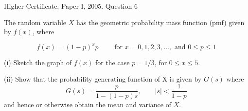 \documentclass[a4paper,12pt]{article}
\begin{document}
Higher Certificate, Paper I, 2005. Question 6
\begin{framed}
The random variable $X$ has the geometric probability mass function (pmf) given by
$f(x)$, where

\[ f(x)  = (1-p)^x p  \qquad \mbox{ for } x=0,1,2,3,\ldots, \mbox{ and }0\leq p \leq 1\]

(i) Sketch the graph of $f(x)$ for the case $p = 1/3$, for $0 \leq x \leq 5$.

(ii) Show that the probability generating function of X is given by $G(s)$ where
\[ G(s) = \frac{p}{1-(1-p)s} , \qquad |s| < \frac{1}{1-p} \]
and hence or otherwise obtain the mean and variance of $X$.
\end{framed}

\end{document}
